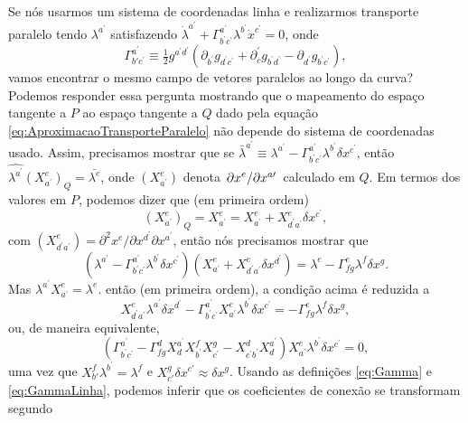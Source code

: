 Se nós usarmos um sistema de coordenadas linha e realizarmos transporte paralelo tendo $\lambda^{a^\prime}$ satisfazendo $\dot{\lambda}^{a^{\prime}}+\Gamma_{b^{\prime} c^{\prime}}^{a^{\prime}} \lambda^{b^{\prime}} \dot{x}^{c^{\prime}}=0$, onde
\begin{equation}\label{eq:GammaLinha}
	\Gamma_{b' c^{\prime}}^{a^{\prime}} \equiv \tfrac{1}{2} g^{a^{\prime} d^{\prime}}\left(\partial_{b^{\prime}} g_{d^{\prime} c^{\prime}}+\partial_{c}^{\prime} g_{b^{\prime} d^{\prime}}-\partial_{d^{\prime}} g_{b^{\prime} c^{\prime}}\right),
\end{equation}
vamos encontrar o mesmo campo de vetores paralelos ao longo da curva? Podemos responder essa pergunta mostrando que o mapeamento do espaço tangente a $P$ ao espaço tangente a $Q$ dado pela equação \eqref{eq:AproximacaoTransporteParalelo} não depende do sistema de coordenadas usado. Assim, precisamos mostrar que se $\bar{\lambda}^{a^{\prime}}\equiv \lambda^{a^\prime} - \Gamma_{b^{\prime} c^{\prime}}^{a^{\prime}} \lambda^{b^{\prime}} \delta x^{c^{\prime}}$, então $\hat{\lambda^{a^\prime}}(X^e_{a^\prime})_Q=\bar{\lambda^e}$, onde $(X^e_{a^\prime})$ denota $\pdv*{x^e}{x^{a\prime}}$ calculado em $Q$. Em termos dos valores em $P$, podemos dizer que (em primeira ordem)
\[
	(X^e_{a^\prime})_Q = X^e_{a^\prime} = X^e_{a^\prime}+X^e_{d^\prime a^\prime} \delta x^{c^\prime} ,
\]
com $(X^e_{d^\prime a^\prime})=\partial^2x^e/\partial x^{d^\prime}\partial x^{a^\prime}$, então nós precisamos mostrar que 
\[
	\left(\lambda^{a^{\prime}}-\Gamma_{b^{\prime} c^{\prime}}^{a^{\prime}} \lambda^{b^{\prime}} \delta x^{c^{\prime}}\right)\left(X_{a^{\prime}}^{e}+X_{d^{\prime} a^{\prime}}^{e} \delta x^{d^{\prime}}\right)=\lambda^{e}-\Gamma_{f g}^{e} \lambda^{f} \delta x^{g}.
\]
Mas $\lambda^{a^\prime}X^e_{a^\prime}=\lambda^e$. então (em primeira ordem), a condição acima é reduzida a
\[
	X_{d^{\prime} a^{\prime}}^{e} \lambda^{a^{\prime}} \delta x^{d^{\prime}}-\Gamma_{b^{\prime} c^{\prime}}^{a^{\prime}} X_{a^{\prime}}^{e} \lambda^{b^{\prime}} \delta x^{c^{\prime}}=-\Gamma_{f g}^{e} \lambda^{f} \delta x^{g} ,
\]
ou, de maneira equivalente,
\begin{equation}\label{eq:CondicaoIndependenciaCoordenada}
	\left(\Gamma_{b^{\prime} c^{\prime}}^{a^{\prime}}-\Gamma_{f g}^{d} X_{d}^{a^{\prime}} X_{b^{\prime}}^{f} X_{c^{\prime}}^{g}-X_{c^{\prime} b^{\prime}}^{d} X_{d}^{a^{\prime}}\right) X_{a^{\prime}}^{e} \lambda^{b^{\prime}} \delta x^{c^{\prime}}=0,
\end{equation}
uma vez que $X^f_{b'}\lambda^{b^\prime}=\lambda^f$ e $X^g_{c'}\delta x^{c'}\approx \delta x^g$. Usando as definições \eqref{eq:Gamma} e \eqref{eq:GammaLinha}, podemos inferir que os coeficientes de conexão se transformam segundo
